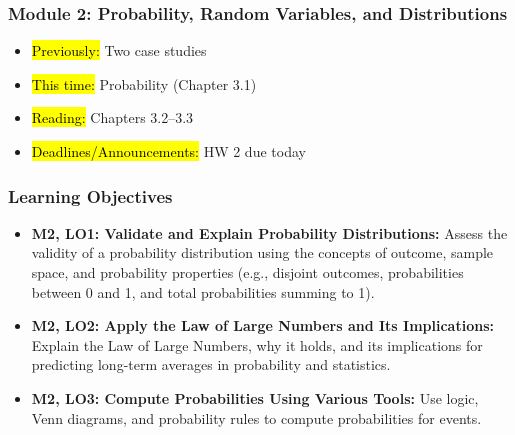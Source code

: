 
\begin{frame}
    \frametitle{Module 2: Probability, Random Variables, and Distributions}
    \begin{itemize}
        \item \hl{Previously: }Two case studies
        \item \hl{This time: }Probability (Chapter 3.1)
        \item \hl{Reading: }Chapters 3.2--3.3
        \item \hl{Deadlines/Announcements: } HW 2 due today
    \end{itemize}

\end{frame}

\begin{frame}
    \frametitle{Learning Objectives}
    \begin{itemize}
        \item \textbf{M2, LO1: Validate and Explain Probability Distributions:} Assess the validity of a probability distribution using the concepts of outcome, sample space, and probability properties (e.g., disjoint outcomes, probabilities between 0 and 1, and total probabilities summing to 1).
        \item \textbf{M2, LO2: Apply the Law of Large Numbers and Its Implications:} Explain the Law of Large Numbers, why it holds, and its implications for predicting long-term averages in probability and statistics.
        \item \textbf{M2, LO3: Compute Probabilities Using Various Tools:} Use logic, Venn diagrams, and probability rules to compute probabilities for events.
    \end{itemize}
\end{frame}
